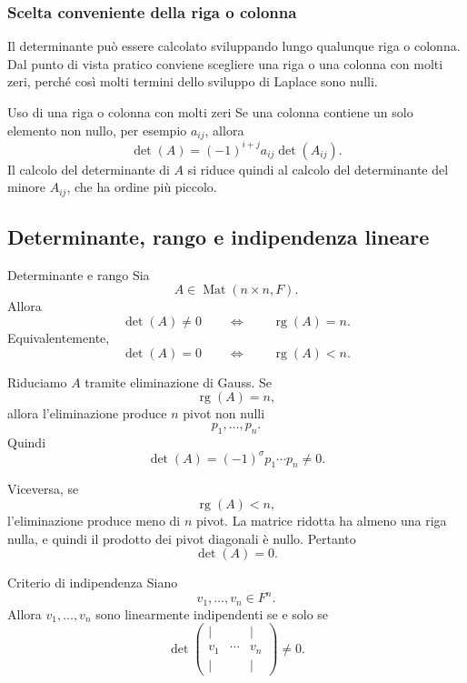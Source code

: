 \documentclass[a4paper]{article}
\begin{document}
\subsubsection{Scelta conveniente della riga o colonna}

Il determinante può essere calcolato sviluppando lungo qualunque riga o colonna. Dal punto di vista pratico conviene scegliere una riga o una colonna con molti zeri, perché così molti termini dello sviluppo di Laplace sono nulli.

\begin{snippetexample}{Uso di una riga o colonna con molti zeri}
    Se una colonna contiene un solo elemento non nullo, per esempio \(a_{ij}\), allora
    \[
        \det(A)
        =
        (-1)^{i+j}a_{ij}\det(A_{ij}).
    \]
    Il calcolo del determinante di \(A\) si riduce quindi al calcolo del determinante del minore \(A_{ij}\), che ha ordine più piccolo.
\end{snippetexample}

\subsection{Determinante, rango e indipendenza lineare}

\begin{snippetproposition}{Determinante e rango}
    Sia
    \[
        A\in\operatorname{Mat}(n\times n,F).
    \]
    Allora
    \[
        \det(A)\neq 0
        \qquad
        \Longleftrightarrow
        \qquad
        \operatorname{rg}(A)=n.
    \]
    Equivalentemente,
    \[
        \det(A)=0
        \qquad
        \Longleftrightarrow
        \qquad
        \operatorname{rg}(A)<n.
    \]
\end{snippetproposition}

\begin{snippetproof}{}
    Riduciamo \(A\) tramite eliminazione di Gauss. Se
    \[
        \operatorname{rg}(A)=n,
    \]
    allora l'eliminazione produce \(n\) pivot non nulli
    \[
        p_1,\ldots,p_n.
    \]
    Quindi
    \[
        \det(A)=(-1)^\sigma p_1\cdots p_n\neq 0.
    \]

    Viceversa, se
    \[
        \operatorname{rg}(A)<n,
    \]
    l'eliminazione produce meno di \(n\) pivot. La matrice ridotta ha almeno una riga nulla, e quindi il prodotto dei pivot diagonali è nullo. Pertanto
    \[
        \det(A)=0.
    \]
\end{snippetproof}

\begin{snippetcorollary}{Criterio di indipendenza}
    Siano
    \[
        v_1,\ldots,v_n\in F^n.
    \]
    Allora \(v_1,\ldots,v_n\) sono linearmente indipendenti se e solo se
    \[
        \det
        \begin{pmatrix}
            \vert & & \vert\\
            v_1 & \cdots & v_n\\
            \vert & & \vert
        \end{pmatrix}
        \neq 0.
    \]
\end{snippetcorollary}
\end{document}
